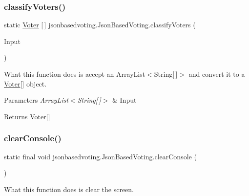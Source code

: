 \subsubsection{\texorpdfstring{classifyVoters()}{classifyVoters()}}
{\footnotesize\ttfamily static \mbox{\hyperlink{classjsonbasedvoting_1_1_voter}{Voter}} \mbox{[}$\,$\mbox{]} jsonbasedvoting.\+Json\+Based\+Voting.\+classify\+Voters (\begin{DoxyParamCaption}\item[{Array\+List$<$ String\mbox{[}$\,$\mbox{]}$>$}]{Input }\end{DoxyParamCaption})\hspace{0.3cm}{\ttfamily [static]}}

What this function does is accept an Array\+List$<$\+String\mbox{[}$\,$\mbox{]}$>$ and convert it to a \mbox{\hyperlink{classjsonbasedvoting_1_1_voter}{Voter}}\mbox{[}\mbox{]} object. 
\begin{DoxyParams}{Parameters}
{\em Array\+List$<$\+String\mbox{[}$\,$\mbox{]}$>$} & Input \\
\hline
\end{DoxyParams}
\begin{DoxyReturn}{Returns}
\mbox{\hyperlink{classjsonbasedvoting_1_1_voter}{Voter}}\mbox{[}\mbox{]} 
\end{DoxyReturn}
\mbox{\label{classjsonbasedvoting_1_1_json_based_voting_a1d797d0d870297df5f50f56ab63fb7d8}} 
\subsubsection{\texorpdfstring{clearConsole()}{clearConsole()}}
{\footnotesize\ttfamily static final void jsonbasedvoting.\+Json\+Based\+Voting.\+clear\+Console (\begin{DoxyParamCaption}{ }\end{DoxyParamCaption})\hspace{0.3cm}{\ttfamily [static]}}

What this function does is clear the screen. \mbox{\label{classjsonbasedvoting_1_1_json_based_voting_ad2f672b45638c0a0767c01bf51c8098a}} 
